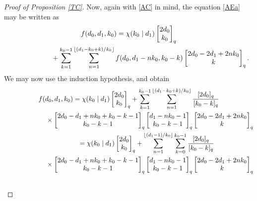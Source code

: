 \documentclass[10pt,a4paper]{amsart}
\def\fl#1{\lfloor#1\rfloor}
\begin{document}
\begin{proof}[Proof of Proposition \ref{TC}]
Now, again with \eqref{AC} in mind, the equation \eqref{AEa} may be written as
\begin{gather*}
f(d_0,d_1,k_0)=
\chi(k_0\mid d_1)\begin{bmatrix} 2d_0\\k_0\end{bmatrix}_q\\ \hphantom{f(d_0,d_1,k_0)=}{}
+\sum_{k=1}^{k_0-1}
\sum_{n=1}^{\fl{(d_1-k_0+k)/k_0}}
f(d_0,d_1-nk_0,k_0-k)
\begin{bmatrix} 2d_0-2d_1+2nk_0\\k\end{bmatrix}_q.
\end{gather*}
We may now use the induction hypothesis, and obtain
\begin{gather}
\notag
f(d_0,d_1,k_0)=\chi(k_0\mid d_1)\begin{bmatrix} 2d_0\\k_0\end{bmatrix}_q
+\sum_{k=1}^{k_0-1}
\sum_{n=1}^{\fl{(d_1-k_0+k)/k_0}}
\frac {[2d_0]_q} {[k_0-k]_q} \\ \notag
\hphantom{f(d_0,d_1,k_0)=}{}
\times\begin{bmatrix} 2d_0-d_1+nk_0+k_0-k-1\\k_0-k-1\end{bmatrix}_q
\begin{bmatrix} d_1-nk_0-1\\
k_0-k-1\end{bmatrix}_q
\begin{bmatrix} 2d_0-2d_1+2nk_0\\k\end{bmatrix}_q\\ \notag \hphantom{f(d_0,d_1,k_0)}{}
=\chi(k_0\mid d_1)\begin{bmatrix} 2d_0\\k_0\end{bmatrix}_q
+\sum_{n=1}^{\fl{(d_1-1)/k_0}}
\sum_{k=0}^{k_0-1}
\frac {[2d_0]_q} {[k_0-k]_q} \\ \notag \hphantom{f(d_0,d_1,k_0)=}{}
\times\begin{bmatrix} 2d_0-d_1+nk_0+k_0-k-1\\k_0-k-1\end{bmatrix}_q
\begin{bmatrix} d_1-nk_0-1\\
k_0-k-1\end{bmatrix}_q
\begin{bmatrix} 2d_0-2d_1+2nk_0\\k\end{bmatrix}_q\\ \hphantom{f(d_0,d_1,k_0)=}{}

\end{gather}
\end{proof}
\end{document}
